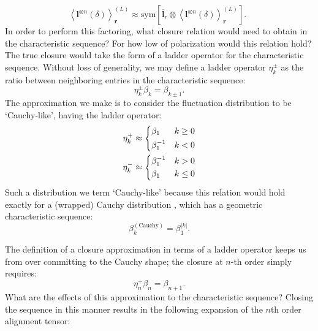 \begin{equation}\left\langle \boldsymbol{l}^{\otimes n}(\delta) \right\rangle_{\boldsymbol{r}}^{(L)} \approx \text{sym}\left\lbrack {\overline{\boldsymbol{l}}}_{r} \otimes \left\langle \boldsymbol{l}^{\otimes n}(\delta) \right\rangle_{\boldsymbol{r}}^{(L)} \right\rbrack.\ \ \end{equation}
In order to perform this factoring, what closure relation would need to obtain in the characteristic sequence? For how low of polarization would this relation hold? The true closure would take the form of a ladder operator for the characteristic sequence. Without loss of generality, we may define a ladder operator \(\eta_{k}^{\pm}\) as the ratio between neighboring entries in the characteristic sequence: 
\begin{equation}
\eta_{k}^{\pm}\beta_{k} = \beta_{k \pm 1}.
\end{equation}
The approximation we make is to consider the fluctuation distribution to be `Cauchy-like', having the ladder operator:
\begin{subequations}
\begin{align}
    \eta^+_k &\approx \begin{dcases}
        \beta_1 &k\geq 0\\
        \beta_1^{-1} &k <0 \\ 
    \end{dcases}\\
    \eta^-_k &\approx \begin{dcases}
        \beta_1^{-1} &k> 0\\
        \beta_1  &k \leq0 \\ 
    \end{dcases}
\end{align}
\label{eq:13_ladder}
\end{subequations}
Such a distribution we term `Cauchy-like' because this relation would
hold exactly for a (wrapped) Cauchy distribution \cite{mardiaStatisticsDirectionalData1975}, which has a geometric
characteristic sequence:
\begin{equation}
\beta_{k}^{(\text{Cauchy})} = \beta_{1}^{|k|}.
\end{equation}

The definition of a closure approximation in terms of a ladder operator keeps us from over committing to the Cauchy shape; the closure at \(n\)-th order simply requires:
\begin{equation}
\eta_{n}^{+}\beta_{n} = \beta_{n + 1}.
\end{equation}
What are the effects of this approximation to the characteristic
sequence? Closing the sequence in this manner results in the following
expansion of the \(n\)th order alignment tensor:

